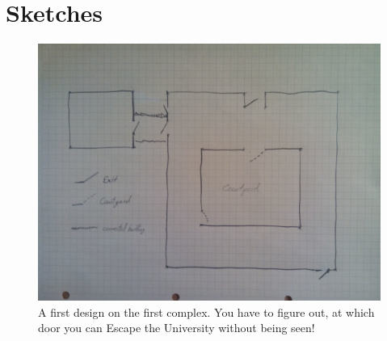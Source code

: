 \documentclass[12pt]{article}
\begin{document}
\section*{Sketches} 
\begin{figure}[H] 
		\includegraphics[width=\textwidth]{Images/mapoverview}
		\caption{A first design on the first complex. You have to figure out, at which door you can Escape the University without being seen!}
\end{figure}
\end{document}
